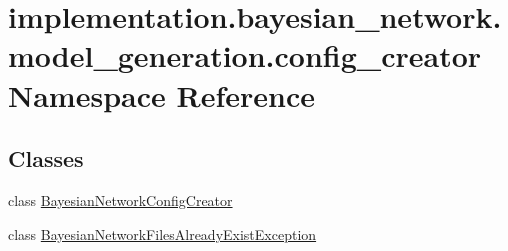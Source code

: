 \hypertarget{namespaceimplementation_1_1bayesian__network_1_1model__generation_1_1config__creator}{}\section{implementation.\+bayesian\+\_\+network.\+model\+\_\+generation.\+config\+\_\+creator Namespace Reference}
\label{namespaceimplementation_1_1bayesian__network_1_1model__generation_1_1config__creator}
\subsection*{Classes}
\begin{DoxyCompactItemize}
\item 
class \hyperlink{classimplementation_1_1bayesian__network_1_1model__generation_1_1config__creator_1_1_bayesian_network_config_creator}{Bayesian\+Network\+Config\+Creator}
\item 
class \hyperlink{classimplementation_1_1bayesian__network_1_1model__generation_1_1config__creator_1_1_bayesian_neaa9550024351ca391a952f36bc1cef38}{Bayesian\+Network\+Files\+Already\+Exist\+Exception}
\end{DoxyCompactItemize}
